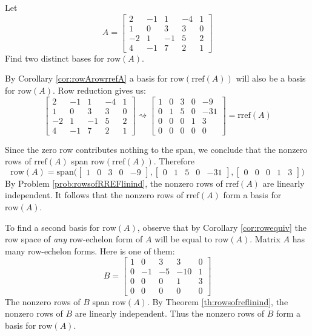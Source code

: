 \documentclass{ximera}
\begin{document}
\begin{example}\label{ex:basisrowspace}
Let
$$A=\begin{bmatrix}2&-1&1&-4&1\\1&0&3&3&0\\-2&1&-1&5&2\\4&-1&7&2&1\end{bmatrix}$$
Find two distinct bases for $\mbox{row}(A)$.
\begin{explanation}
By Corollary \ref{cor:rowArowrrefA} a basis for $\mbox{row}(\mbox{rref}(A))$ will also be a basis for $\mbox{row}(A)$. Row reduction gives us:
$$\begin{bmatrix}2&-1&1&-4&1\\1&0&3&3&0\\-2&1&-1&5&2\\4&-1&7&2&1\end{bmatrix}\rightsquigarrow\begin{bmatrix}1&0&3&0&-9\\0&1&5&0&-31\\0&0&0&1&3\\0&0&0&0&0\end{bmatrix}=\mbox{rref}(A)$$

Since the zero row contributes nothing to the span, we conclude that the nonzero rows of $\mbox{rref}(A)$ span $\mbox{row}(\mbox{rref}(A))$.  Therefore
$$\mbox{row}(A)=\mbox{span}\Big(\begin{bmatrix}1&0&3&0&-9\end{bmatrix},
\begin{bmatrix}0&1&5&0&-31\end{bmatrix},
\begin{bmatrix}0&0&0&1&3\end{bmatrix}\Big)$$
By Problem \ref{prob:rowsofRREFlinind}, the nonzero rows of $\mbox{rref}(A)$ are linearly independent.
It follows that the nonzero rows of $\mbox{rref}(A)$ form a basis for $\mbox{row}(A)$.

To find a second basis for $\mbox{row}(A)$, observe that by Corollary \ref{cor:rowequiv} the row space of {\it any} row-echelon form of $A$ will be equal to $\mbox{row}(A)$.  Matrix $A$ has many row-echelon forms.  Here is one of them:
$$B=\begin{bmatrix}1&0&3&3&0\\0&-1&-5&-10&1\\0&0&0&1&3\\0&0&0&0&0 \end{bmatrix}$$
The nonzero rows of $B$ span $\mbox{row}(A)$.  By Theorem \ref{th:rowsofreflinind}, the nonzero rows of $B$ are linearly independent.  Thus the nonzero rows of $B$ form a basis for $\mbox{row}(A)$.
\end{explanation}
\end{example}
\end{document}

